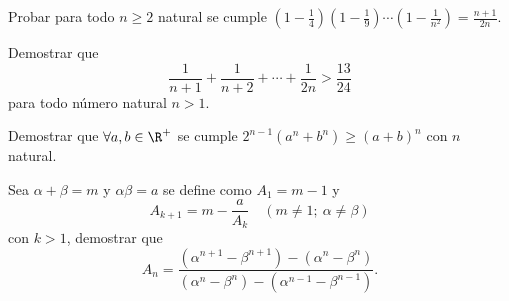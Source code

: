 \begin{multicols}{2}
    \begin{exercise}
        Probar para todo $n\geq 2$ natural se cumple $\left(1 - \frac{1}{4}\right) \left(1 - \frac{1}{9}\right) \cdots \left(1 - \frac{1}{n^2}\right) = \frac{n + 1}{2n}.$
    \end{exercise}

    \begin{exercise}
        Demostrar que
        \[
            \frac{1}{n + 1} + \frac{1}{n + 2} + \cdots + \frac{1}{2n} > \frac{13}{24}
        \]
        para todo número natural $n > 1$.
    \end{exercise}
    \begin{exercise}
        Demostrar que $\forall a, b\in \R^+$ se cumple $2^{n - 1}(a^n + b^n) \geq (a + b)^n$ con $n$ natural.
    \end{exercise}

    \begin{exercise}
        Sea $\alpha + \beta = m$ y $\alpha \beta = a$ se define como $A_1 = m - 1$ y
        \[
            A_{k + 1} = m - \dfrac{a}{A_k} \quad (m \neq 1;\ \alpha \neq \beta)
        \]
        con $k > 1$, demostrar que
        \[
            A_n = \frac{(\alpha^{n + 1} - \beta^{n + 1}) - (\alpha^n - \beta^n)}{(\alpha^n - \beta^n) - (\alpha^{n - 1} - \beta^{n - 1})}.
        \]
    \end{exercise}
\end{multicols}